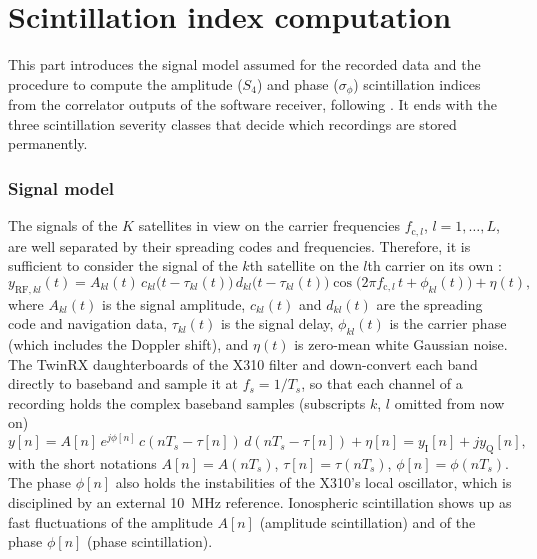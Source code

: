 \documentclass{article}
\makeatletter
\let\old@part\part
\renewcommand{\part}{\clearpage\old@part}
\makeatother
\begin{document}
\part{Scintillation index computation}
\label{part:scintillation}

This part introduces the signal model assumed for the recorded data and the procedure to compute the amplitude ($S_4$) and phase ($\sigma_\phi$) scintillation indices from the correlator outputs of the software receiver, following \cite{wendlerScintillationProcessingSoftware2016,vandierendonckIonosphericScintillationMonitoring1993,vandierendonckMeasuringIonosphericScintillation2004}. It ends with the three scintillation severity classes that decide which recordings are stored permanently.

\section{Signal model}
\label{sec:signal-model}

The signals of the $K$ satellites in view on the carrier frequencies $f_{\mathrm{c},l}$, $l = 1, \ldots, L$, are well separated by their spreading codes and frequencies. Therefore, it is sufficient to consider the signal of the $k$th satellite on the $l$th carrier on its own \cite{wendlerScintillationProcessingSoftware2016}:
\begin{equation}
  y_{\mathrm{RF},kl}(t) = A_{kl}(t)\, c_{kl}\big(t - \tau_{kl}(t)\big)\, d_{kl}\big(t - \tau_{kl}(t)\big) \operatorname{cos}\big(2\pi f_{\mathrm{c},l}\, t + \phi_{kl}(t)\big) + \eta(t),
\end{equation}
where $A_{kl}(t)$ is the signal amplitude, $c_{kl}(t)$ and $d_{kl}(t)$ are the spreading code and navigation data, $\tau_{kl}(t)$ is the signal delay, $\phi_{kl}(t)$ is the carrier phase (which includes the Doppler shift), and $\eta(t)$ is zero-mean white Gaussian noise. The TwinRX daughterboards of the X310 filter and down-convert each band directly to baseband and sample it at $f_s = 1/T_s$, so that each channel of a recording holds the complex baseband samples (subscripts $k$, $l$ omitted from now on)
\begin{equation}
  \label{eq:baseband-signal}
  y[n] = A[n]\, e^{j\phi[n]}\, c(nT_s - \tau[n])\, d(nT_s - \tau[n]) + \eta[n] = y_\mathrm{I}[n] + j y_\mathrm{Q}[n],
\end{equation}
with the short notations $A[n] = A(nT_s)$, $\tau[n] = \tau(nT_s)$, $\phi[n] = \phi(nT_s)$. The phase $\phi[n]$ also holds the instabilities of the X310's local oscillator, which is disciplined by an external 10~MHz reference. Ionospheric scintillation shows up as fast fluctuations of the amplitude $A[n]$ (amplitude scintillation) and of the phase $\phi[n]$ (phase scintillation).
\end{document}
